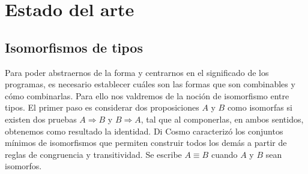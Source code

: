 \documentclass[]{report}
\begin{document}
	\section{Estado del arte}
	\subsection{Isomorfismos de tipos}
	
	Para poder abstraernos de la forma y centrarnos en el significado de los programas, es necesario establecer cuáles son las formas que son combinables y cómo combinarlas.
	Para ello nos valdremos de la noción de isomorfismo entre tipos.
	El primer paso es considerar dos proposiciones $A$ y $B$ como isomorfas si existen dos pruebas $A \Rightarrow B$ y $B \Rightarrow A$, tal que al componerlas, en ambos sentidos, obtenemos como resultado la identidad.
	Di Cosmo \cite{MSCSSurvey05} caracterizó los conjuntos mínimos de isomorfismos que permiten construir todos los demás a partir de reglas de congruencia y transitividad.
	Se escribe $A \equiv B$ cuando $A$ y $B$ sean isomorfos.
	
\end{document}
